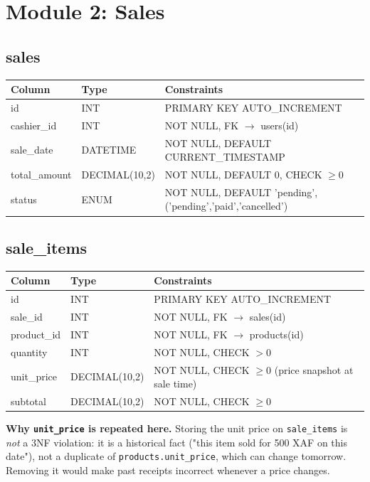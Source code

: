\documentclass[11pt,a4paper]{report}
\newcommand{\schemahead}{%
  \toprule
  \textbf{Column} & \textbf{Type} & \textbf{Constraints} \\
  \midrule
}
\begin{document}
\section{Module 2: Sales}

\subsection*{sales}
\begin{center}
\begin{tabular}{@{}p{3.6cm}p{2.6cm}p{7.3cm}@{}}
\schemahead
id & INT & PRIMARY KEY AUTO\_INCREMENT \\
cashier\_id & INT & NOT NULL, FK $\rightarrow$ users(id) \\
sale\_date & DATETIME & NOT NULL, DEFAULT CURRENT\_TIMESTAMP \\
total\_amount & DECIMAL(10,2) & NOT NULL, DEFAULT 0, CHECK $\geq 0$ \\
status & ENUM & NOT NULL, DEFAULT 'pending', ('pending','paid','cancelled') \\
\bottomrule
\end{tabular}
\end{center}

\subsection*{sale\_items}
\begin{center}
\begin{tabular}{@{}p{3.6cm}p{2.6cm}p{7.3cm}@{}}
\schemahead
id & INT & PRIMARY KEY AUTO\_INCREMENT \\
sale\_id & INT & NOT NULL, FK $\rightarrow$ sales(id) \\
product\_id & INT & NOT NULL, FK $\rightarrow$ products(id) \\
quantity & INT & NOT NULL, CHECK $> 0$ \\
unit\_price & DECIMAL(10,2) & NOT NULL, CHECK $\geq 0$ (price snapshot at sale time) \\
subtotal & DECIMAL(10,2) & NOT NULL, CHECK $\geq 0$ \\
\bottomrule
\end{tabular}
\end{center}

\begin{infobox}
\textbf{Why \texttt{unit\_price} is repeated here.} Storing the unit price on
\texttt{sale\_items} is \emph{not} a 3NF violation: it is a historical fact
("this item sold for 500 XAF on this date"), not a duplicate of
\texttt{products.unit\_price}, which can change tomorrow. Removing it would
make past receipts incorrect whenever a price changes.
\end{infobox}
\end{document}

